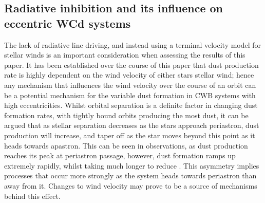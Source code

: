 \subsection{Radiative inhibition and its influence on eccentric WCd systems}


The lack of radiative line driving, and instead using a terminal velocity model for stellar winds is an important consideration when assessing the results of this paper.
It has been established over the course of this paper that dust production rate is highly dependent on the wind velocity of either stars stellar wind; hence any mechanism that influences the wind velocity over the course of an orbit can be a potential mechanism for the variable dust formation in CWB systems with high eccentricities.
Whilst orbital separation is a definite factor in changing dust formation rates, with tightly bound orbits producing the most dust, it can be argued that as stellar separation decreases as the stars approach periastron, dust production will increase, and taper off as the star moves beyond this point as it heads towards apastron.
This can be seen in observations, as dust production reaches its peak at periastron passage, however, dust formation ramps up extremely rapidly, whilst taking much longer to reduce \parencite{williamsDustFormationCollidingwind2008,williams_orbitally_2009}.
This asymmetry implies processes that occur more strongly as the system heads towards periastron than away from it.
Changes to wind velocity may prove to be a source of mechanisms behind this effect.

